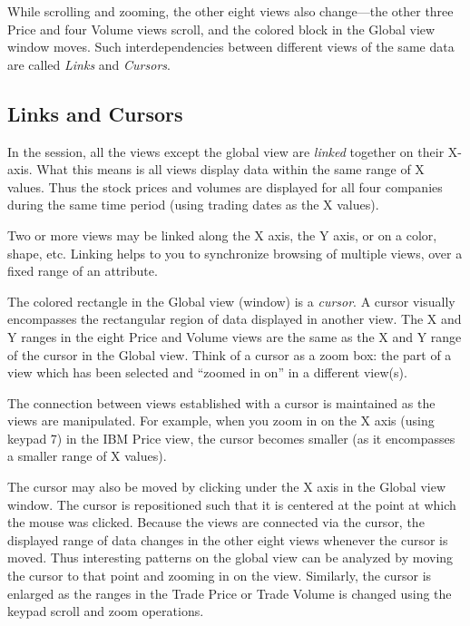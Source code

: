 While scrolling and zooming, the other eight views also change---the other three
Price and four Volume views scroll, and the colored block in the Global view
window moves. Such interdependencies between different views of the same data
are called {\em Links} and {\em Cursors}.


\subsection{Links and Cursors}

In the  session, all the views except the global view are {\em
linked} together on their X-axis. What this means is all views display data
within the same range of X values. Thus the stock prices and volumes are
displayed for all four companies during the same time period (using trading
dates as the X values).

Two or more views may be linked along the X axis, the Y axis, or on a color,
shape, etc. Linking helps to you to synchronize browsing of multiple views, over
a fixed range of an attribute.

The colored rectangle in the Global view (window) is a {\em cursor}. A cursor
visually encompasses the rectangular region of data displayed in another
view. The X and Y ranges in the eight Price and Volume views are the same as the
X and Y range of the cursor in the Global view. Think of a cursor as a zoom box:
the part of a view which has been selected and ``zoomed in on'' in a different
view(s).

The connection between views established with a cursor is maintained as the
views are manipulated. For example, when you zoom in on the X axis (using keypad
7) in the IBM Price view, the cursor becomes smaller (as it encompasses a
smaller range of X values).

The cursor may also be moved by clicking under the X axis in the Global view
window. The cursor is repositioned such that it is centered at the point at
which the mouse was clicked. Because the views are connected via the cursor, the
displayed range of data changes in the other eight views whenever the cursor is
moved. Thus interesting patterns on the global view can be analyzed by moving
the cursor to that point and zooming in on the view. Similarly, the cursor is
enlarged as the ranges in the Trade Price or Trade Volume is changed using the
keypad scroll and zoom operations.

